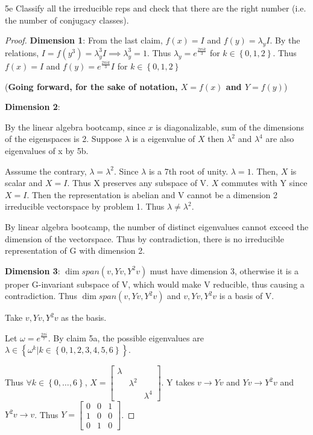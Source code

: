 \documentclass{article}
\begin{document}
\begin{claim}{5e}\label{Claim 5e.}
    Classify all the irreducible reps and check that there are the right number (i.e. the number of conjugacy classes).
\end{claim}
\begin{proof}
    \textbf{Dimension 1}: From the last claim, $f(x) = I$ and $f(y) = \lambda_y I$. By the relations, $I = f(y^3) = \lambda_y^3 I \implies \lambda_y^3 = 1$. Thus $\lambda_y = e^{\frac{2 \pi i k}{3}}$ for $k \in \left\{ 0, 1, 2 \right\}$. Thus $f(x) = I$ and $f(y) = e^{\frac{2 \pi i k}{3}} I $ for $k \in \left\{ 0, 1, 2 \right\}$    
    
    (\textbf{Going forward, for the sake of notation, $X = f(x)$ and $Y = f(y)$})

    \textbf{Dimension 2}: 
    
    By the linear algebra bootcamp, since $x$ is diagonalizable, sum of the dimensions of the eigenspaces is 2. Suppose $\lambda$ is a eigenvalue of $X$ then $\lambda^2$ and $\lambda^4$ are also eigenvalues of x by 5b. 
    
    Asssume the contrary, $\lambda = \lambda^2$. Since $\lambda$ is a 7th root of unity. $\lambda = 1$. Then, $X$ is scalar and $X = I$. Thus X preserves any subspace of V. $X$ commutes with Y since $X = I$. Then the representation is abelian and V cannot be a dimension 2 irreducible vectorspace by problem 1. Thus $\lambda \neq \lambda^2$. 
    
    
    By linear algebra bootcamp, the number of distinct eigenvalues cannot exceed the dimension of the vectorspace. Thus by contradiction, there is no irreducible representation of G with dimension 2.   
    
    
    
             
    \textbf{Dimension 3}: $\dim span(v, Yv, Y^2v)$ must have dimension 3, otherwise it is a proper G-invariant subspace of V, which would make V reducible, thus causing a contradiction. Thus $\dim span(v, Yv, Y^2v)$ and $v, Yv, Y^2v$ is a basis of V. 

    Take $v, Yv, Y^2v$ as the basis.
    
    Let $\omega = e^{\frac{2 \pi i}{7}}$. By claim 5a, the possible eigenvalues are $\lambda \in \left\{ \omega^k | k \in \left\{ 0, 1, 2, 3, 4, 5, 6 \right\} \right\}$. 
    
    Thus $\forall k \in \left\{ 0, \dots, 6 \right\}$, $X = \begin{bmatrix}
        \lambda \\  & \lambda^2 \\  & & \lambda^4
    \end{bmatrix}$. Y takes $v \to Yv$ and $Yv \to Y^2v$ and $Y^2v \to v$. Thus $Y = \begin{bmatrix}
        0 & 0 & 1 \\ 1 & 0 & 0 \\  0 & 1 & 0
    \end{bmatrix}$.


\end{proof}
\end{document}
